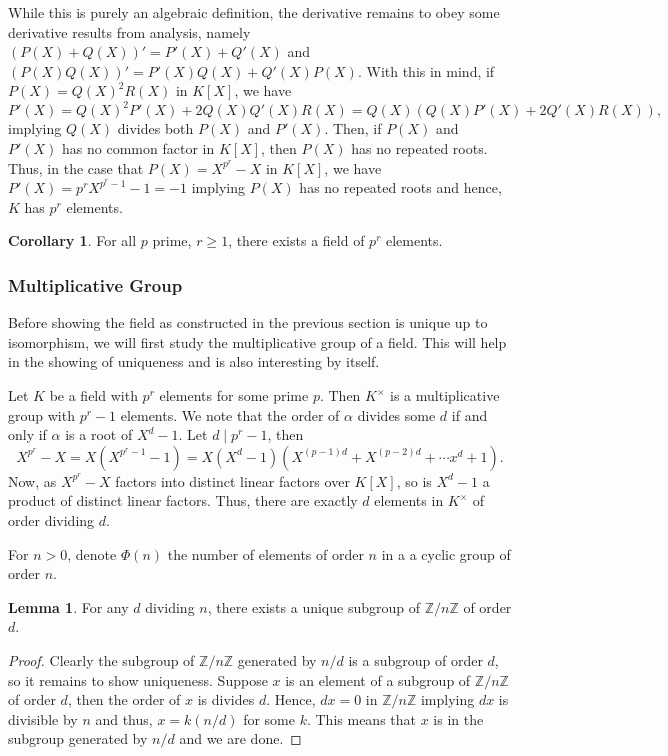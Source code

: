 \documentclass[]{article}
\theoremstyle{definition}
\newtheorem{corollary}{Corollary}[theorem]
\theoremstyle{definition}
\newtheorem{lemma}{Lemma}[section]
\begin{document}
While this is purely an algebraic definition, the derivative remains to obey 
some derivative results from analysis, namely \((P(X) + Q(X))' = P'(X) + Q'(X)\) 
and \((P(X)Q(X))' = P'(X)Q(X) + Q'(X)P(X)\). With this in mind, if 
\(P(X) = Q(X)^2 R(X)\) in \(K[X]\), we have 
\[P'(X) = Q(X)^2 P'(X) + 2Q(X)Q'(X)R(X) = Q(X)(Q(X)P'(X) + 2Q'(X)R(X)),\]
implying \(Q(X)\) divides both \(P(X)\) and \(P'(X)\). Then, if \(P(X)\) 
and \(P'(X)\) has no common factor in \(K[X]\), then \(P(X)\) has 
no repeated roots. Thus, in the case that \(P(X) = X^{p^r} - X\) in \(K[X]\), 
we have \(P'(X) = p^r X^{p^r - 1} - 1 = -1\) implying \(P(X)\) 
has no repeated roots and hence, \(K\) has \(p^r\) elements.

\begin{corollary}
  For all \(p\) prime, \(r \ge 1\), there exists a field of \(p^r\) elements.
\end{corollary}

\subsubsection{Multiplicative Group}

Before showing the field as constructed in the previous section is unique up 
to isomorphism, we will first study the multiplicative group of a field. 
This will help in the showing of uniqueness and is also interesting by itself.

Let \(K\) be a field with \(p^r\) elements for some prime \(p\). Then \(K^\times\) 
is a multiplicative group with \(p^r - 1\) elements. We note that the order 
of \(\alpha\) divides some \(d\) if and only if \(\alpha\) is a root of 
\(X^d - 1\). Let \(d \mid p^r - 1\), then 
\[X^{p^r} - X = X(X^{p^r - 1} - 1) = 
  X(X^d - 1)(X^{(p - 1)d} + X^{(p - 2)d} + \cdots x^d + 1).\]
Now, as \(X^{p^r} - X\) factors into distinct linear factors over \(K[X]\), so 
is \(X^d - 1\) a product of distinct linear factors. Thus, there are exactly 
\(d\) elements in \(K^\times\) of order dividing \(d\).

For \(n > 0\), denote \(\Phi(n)\) the number of elements of order \(n\) in a 
a cyclic group of order \(n\).

\begin{lemma}
  For any \(d\) dividing \(n\), there exists a unique subgroup of 
  \(\mathbb{Z}/n\mathbb{Z}\) of order \(d\).
\end{lemma}
\begin{proof}
  Clearly the subgroup of \(\mathbb{Z}/n\mathbb{Z}\) generated by 
  \(n / d\) is a subgroup of order \(d\), so it remains to show uniqueness. 
  Suppose \(x\) is an element of a subgroup of \(\mathbb{Z}/n\mathbb{Z}\) of 
  order \(d\), then the order of \(x\) is divides \(d\). Hence, 
  \(dx = 0\) in \(\mathbb{Z}/n\mathbb{Z}\) implying \(dx\) is divisible by \(n\)
  and thus, \(x = k (n / d)\) for some \(k\). This means that \(x\) is in the 
  subgroup generated by \(n / d\) and we are done.
\end{proof}
\end{document}

